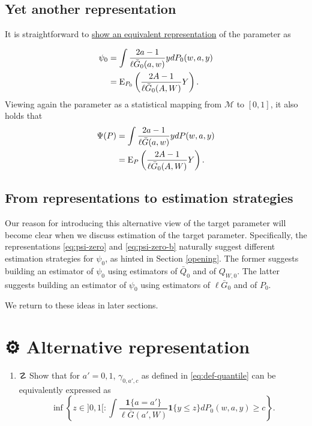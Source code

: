 \documentclass[
  11pt,
  openright,twoside]{book}
\providecommand{\tightlist}{%
  \setlength{\itemsep}{0pt}\setlength{\parskip}{0pt}}
\newcommand{\gear}{\usebox{\gearbox}\;}
\DeclareRobustCommand{\stixdanger}{%
  {\usefont{U}{stixbbit}{m}{it}\symbol{"F6}}%
}
\newcommand{\calM}{\mathcal{M}}
\newcommand{\Exp}{\textrm{E}}
\newcommand{\Gbar}{\bar{G}}
\newcommand{\one}{\textbf{1}}
\newcommand{\Qbar}{\bar{Q}}
\theoremstyle{definition}
\theoremstyle{definition}
\theoremstyle{definition}
\theoremstyle{definition}
\theoremstyle{remark}
\begin{document}
\hypertarget{yet-another}{%
\subsection{Yet another representation}\label{yet-another}}

It is straightforward to \protect\hyperlink{another-rep}{show an equivalent representation} of
the parameter as

\begin{align}  \notag  \psi_{0}  &=  \int \frac{2a  -  1}{\ell\Gbar_0(a,w)}  y
dP_0(w,a,y)   \\   \label{eq:psi-zero-b}   &=   \Exp_{P_0}   \left(   \frac{2A   -
1}{\ell\Gbar_{0}(A,W)} Y \right).  \end{align} Viewing again the parameter as
a statistical mapping from \(\calM\) to \([0,1]\), it also holds that
\begin{align} \notag  \Psi(P) &= \int \frac{2a-1}{\ell\Gbar(a,w)}  y dP(w,a,y)
\\  \label{eq:psi-zero-c}  &=  \Exp_{P}\left(\frac{2A -  1}{\ell\Gbar_{0}(A,W)}  Y
\right).  \end{align}

\hypertarget{rep-to-est}{%
\subsection{From representations to estimation strategies}\label{rep-to-est}}

Our reason for introducing this alternative view of the target parameter will
become clear when we discuss estimation of the target parameter. Specifically,
the representations \eqref{eq:psi-zero} and \eqref{eq:psi-zero-b} naturally
suggest different estimation strategies for \(\psi_0\), as hinted in Section
\ref{opening}. The former suggests building an estimator of \(\psi_0\) using
estimators of \(\Qbar_0\) and of \(Q_{W,0}\). The latter suggests building an
estimator of \(\psi_0\) using estimators of \(\ell\Gbar_0\) and of \(P_0\).

We return to these ideas in later sections.

\hypertarget{exo-alternative-parameter-third-pass}{%
\section{\texorpdfstring{⚙ \gear Alternative representation}{⚙ Alternative representation}}\label{exo-alternative-parameter-third-pass}}

\begin{enumerate}
\def\labelenumi{\arabic{enumi}.}
\tightlist
\item
  ☡ \stixdanger{} Show that for \(a' = 0,1\), \(\gamma_{0,a',c}\) as defined in
  \eqref{eq:def-quantile} can be equivalently expressed as \begin{equation*}\inf
  \left\{z \in ]0,1[  : \int \frac{\one\{a =  a'\}}{\ell\Gbar(a',W)} \one\{y \le
  z\} dP_0(w,a,y) \ge c \right\}.\end{equation*}
\end{enumerate}
\end{document}
